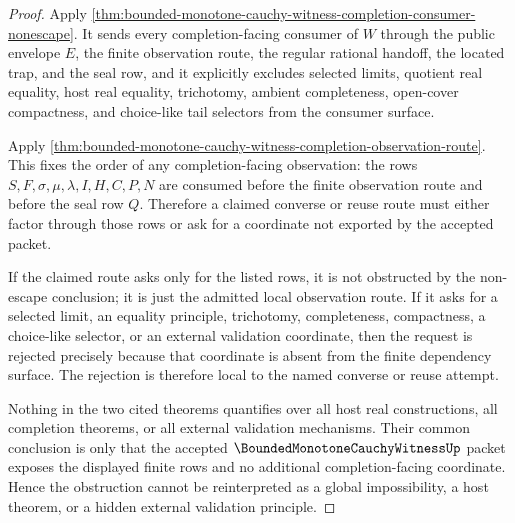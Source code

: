 \begin{proof}
Apply \autoref{thm:bounded-monotone-cauchy-witness-completion-consumer-nonescape}. It sends every completion-facing consumer of $W$ through the public envelope $E$, the finite observation route, the regular rational handoff, the located trap, and the seal row, and it explicitly excludes selected limits, quotient real equality, host real equality, trichotomy, ambient completeness, open-cover compactness, and choice-like tail selectors from the consumer surface.

Apply \autoref{thm:bounded-monotone-cauchy-witness-completion-observation-route}. This fixes the order of any completion-facing observation: the rows $S,F,\sigma,\mu,\lambda,I,H,C,P,N$ are consumed before the finite observation route and before the seal row $Q$. Therefore a claimed converse or reuse route must either factor through those rows or ask for a coordinate not exported by the accepted packet.

If the claimed route asks only for the listed rows, it is not obstructed by the non-escape conclusion; it is just the admitted local observation route. If it asks for a selected limit, an equality principle, trichotomy, completeness, compactness, a choice-like selector, or an external validation coordinate, then the request is rejected precisely because that coordinate is absent from the finite dependency surface. The rejection is therefore local to the named converse or reuse attempt.

Nothing in the two cited theorems quantifies over all host real constructions, all completion theorems, or all external validation mechanisms. Their common conclusion is only that the accepted $\BoundedMonotoneCauchyWitnessUp$ packet exposes the displayed finite rows and no additional completion-facing coordinate. Hence the obstruction cannot be reinterpreted as a global impossibility, a host theorem, or a hidden external validation principle.
\end{proof}
